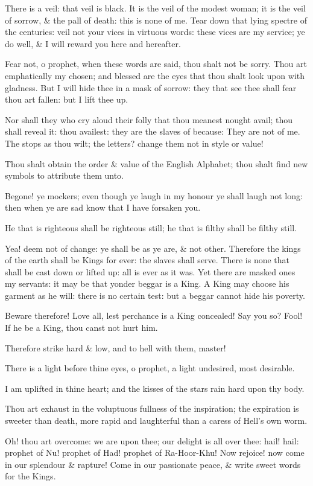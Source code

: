 There is a veil: that veil is black. It is the veil of the modest woman; it is the veil of sorrow, & the pall of death: this is none of me. Tear down that lying spectre of the centuries: veil not your vices in virtuous words: these vices are my service; ye do well, & I will reward you here and hereafter.

Fear not, o prophet, when these words are said, thou shalt not be sorry. Thou art emphatically my chosen; and blessed are the eyes that thou shalt look upon with gladness. But I will hide thee in a mask of sorrow: they that see thee shall fear thou art fallen: but I lift thee up.

Nor shall they who cry aloud their folly that thou meanest nought avail; thou shall reveal it: thou availest: they are the slaves of because: They are not of me. The stops as thou wilt; the letters? change them not in style or value!

Thou shalt obtain the order & value of the English Alphabet; thou shalt find new symbols to attribute them unto.

Begone! ye mockers; even though ye laugh in my honour ye shall laugh not long: then when ye are sad know that I have forsaken you.

He that is righteous shall be righteous still; he that is filthy shall be filthy still.

Yea! deem not of change: ye shall be as ye are, & not other. Therefore the kings of the earth shall be Kings for ever: the slaves shall serve. There is none that shall be cast down or lifted up: all is ever as it was. Yet there are masked ones my servants: it may be that yonder beggar is a King. A King may choose his garment as he will: there is no certain test: but a beggar cannot hide his poverty.

Beware therefore! Love all, lest perchance is a King concealed! Say you so? Fool! If he be a King, thou canst not hurt him.

Therefore strike hard & low, and to hell with them, master!

There is a light before thine eyes, o prophet, a light undesired, most desirable.

I am uplifted in thine heart; and the kisses of the stars rain hard upon thy body.

Thou art exhaust in the voluptuous fullness of the inspiration; the expiration is sweeter than death, more rapid and laughterful than a caress of Hell's own worm.

Oh! thou art overcome: we are upon thee; our delight is all over thee: hail! hail: prophet of Nu! prophet of Had! prophet of Ra-Hoor-Khu! Now rejoice! now come in our splendour & rapture! Come in our passionate peace, & write sweet words for the Kings.

